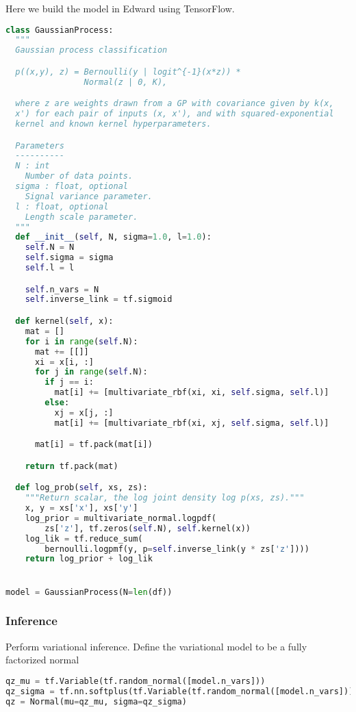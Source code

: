 Here we build the model in Edward using TensorFlow.
\begin{lstlisting}[language=Python]
class GaussianProcess:
  """
  Gaussian process classification

  p((x,y), z) = Bernoulli(y | logit^{-1}(x*z)) *
                Normal(z | 0, K),

  where z are weights drawn from a GP with covariance given by k(x,
  x') for each pair of inputs (x, x'), and with squared-exponential
  kernel and known kernel hyperparameters.

  Parameters
  ----------
  N : int
    Number of data points.
  sigma : float, optional
    Signal variance parameter.
  l : float, optional
    Length scale parameter.
  """
  def __init__(self, N, sigma=1.0, l=1.0):
    self.N = N
    self.sigma = sigma
    self.l = l

    self.n_vars = N
    self.inverse_link = tf.sigmoid

  def kernel(self, x):
    mat = []
    for i in range(self.N):
      mat += [[]]
      xi = x[i, :]
      for j in range(self.N):
        if j == i:
          mat[i] += [multivariate_rbf(xi, xi, self.sigma, self.l)]
        else:
          xj = x[j, :]
          mat[i] += [multivariate_rbf(xi, xj, self.sigma, self.l)]

      mat[i] = tf.pack(mat[i])

    return tf.pack(mat)

  def log_prob(self, xs, zs):
    """Return scalar, the log joint density log p(xs, zs)."""
    x, y = xs['x'], xs['y']
    log_prior = multivariate_normal.logpdf(
        zs['z'], tf.zeros(self.N), self.kernel(x))
    log_lik = tf.reduce_sum(
        bernoulli.logpmf(y, p=self.inverse_link(y * zs['z'])))
    return log_prior + log_lik


model = GaussianProcess(N=len(df))
\end{lstlisting}


\subsubsection{Inference}

Perform variational inference.
Define the variational model to be a fully factorized normal
\begin{lstlisting}[language=Python]
qz_mu = tf.Variable(tf.random_normal([model.n_vars]))
qz_sigma = tf.nn.softplus(tf.Variable(tf.random_normal([model.n_vars])))
qz = Normal(mu=qz_mu, sigma=qz_sigma)
\end{lstlisting}

